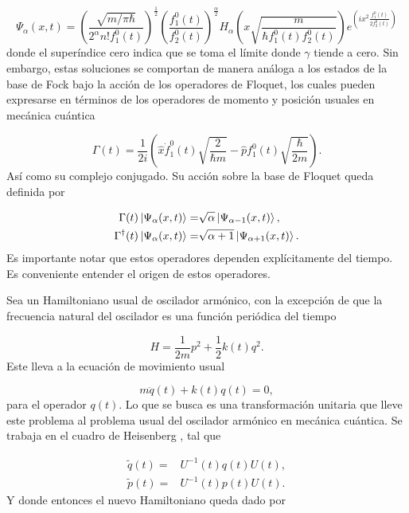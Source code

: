 \documentclass[10pt,a4paper]{report}
\begin{document}
\begin{equation}
\Psi_\alpha (x,t) = (\frac{\sqrt{m/\pi\hbar}}{2^\alpha n! f_1^0(t)})^{\frac{1}{2}}(\frac{f_1^0(t)}{f_2^0(t)})^\frac{\alpha}{2}H_\alpha(x\sqrt{\frac{m}{\hbar f_1^0(t) f_2^0(t)}})e^{(ix^2\frac{f_1^0(t)}{2f_2^0(t)})}
\end{equation} donde el superíndice cero indica que se toma el límite donde $\gamma$ tiende a cero. Sin embargo, estas soluciones se comportan de manera análoga a los estados de la base de Fock bajo la acción de los operadores de Floquet, los cuales pueden expresarse en términos de los operadores de momento y posición usuales en mecánica cuántica

\begin{equation}\label{FloquetOperators}
\Gamma(t) = \frac{1}{2i}(\hat{x}\dot{f}_1^0(t)\sqrt{\frac{2}{\hbar m}}-\hat{p}f_1^0(t)\sqrt{\frac{\hbar}{2m}}).
\end{equation} Así como su complejo conjugado. Su acción sobre la base de Floquet queda definida por

\begin{align*}
\Gamma(t) \Ket{\Psi_\alpha (x,t)} =& \sqrt{\alpha}\Ket{\Psi_{\alpha-1} (x,t)}, \\
\Gamma^\dagger(t) \Ket{\Psi_\alpha (x,t)} =& \sqrt{\alpha+1}\Ket{\Psi_{\alpha+1} (x,t)}.
\end{align*}Es importante notar que estos operadores dependen explícitamente del tiempo. Es conveniente entender el origen de estos operadores. 

Sea un Hamiltoniano usual de oscilador armónico, con la excepción de que la frecuencia natural del oscilador es una función periódica del tiempo

\begin{equation}\label{TDHO}
H = \frac{1}{2m}p^2 + \frac{1}{2}k(t)q^2.
\end{equation} Este lleva a la ecuación de movimiento usual

\begin{equation}
m\ddot{q}(t) + k(t)q(t) = 0,
\end{equation} para el operador $q(t)$. Lo que se busca es una transformación unitaria que lleve este problema al problema usual del oscilador armónico en mecánica cuántica. Se trabaja en el cuadro de Heisenberg \cite{SakuraiQM}, tal que

\begin{align}
\tilde{q}(t) =& U^{-1}(t)q(t)U(t),\\
\tilde{p}(t) =& U^{-1}(t)p(t)U(t).
\end{align} Y donde entonces el nuevo Hamiltoniano queda dado por
\end{document}
